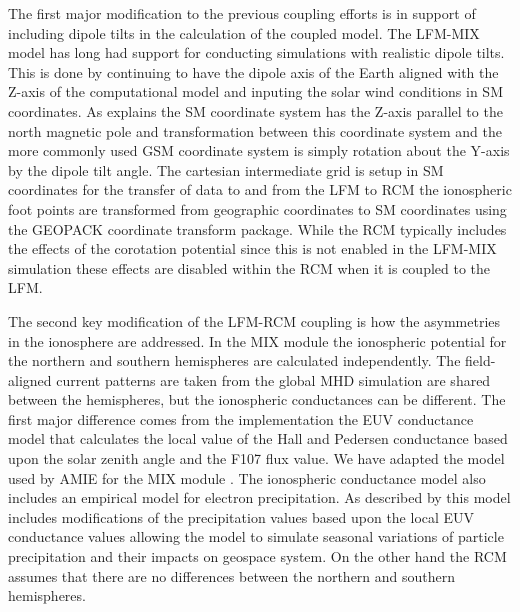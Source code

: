 \documentclass[draft,jgrga]{agutex}
\begin{document}
\begin{article}
The first major modification to the previous coupling efforts is in support of including dipole tilts in the calculation of the coupled model.  The LFM-MIX model has long had support for conducting simulations with realistic dipole tilts.  This is done by continuing to have the dipole axis of the Earth aligned with the Z-axis of the computational model and inputing the solar wind conditions in SM coordinates.  As \cite{1992P&SS...40..711H} explains the SM coordinate system has the Z-axis parallel to the north magnetic pole and transformation between this coordinate system and the more commonly used GSM coordinate system is simply rotation about the Y-axis by the dipole tilt angle.   The cartesian intermediate grid is setup in SM coordinates for the transfer of data to and from the LFM to RCM the ionospheric foot points are transformed from geographic coordinates to SM coordinates using the GEOPACK coordinate transform package.    While the RCM typically includes the effects of the corotation potential since this is not enabled in the LFM-MIX simulation these effects are disabled within the RCM when it is coupled to the LFM.  

The second key modification of the LFM-RCM coupling is how the asymmetries in the ionosphere are addressed.  In the MIX module the ionospheric potential for the northern and southern hemispheres are calculated independently.  The field-aligned current patterns are taken from the global MHD simulation are shared between the hemispheres, but the ionospheric conductances can be different.  The first major difference comes from the implementation the EUV conductance model that calculates the local value of the Hall and Pedersen conductance based upon the solar zenith angle and the F107 flux value.  We have adapted the model used by AMIE for the MIX module \cite{1992AdSpR..12...59R}.  The ionospheric conductance model also includes an empirical model for electron precipitation.  As described by \cite{2009JGRA..11401204W} this model includes modifications of the precipitation values based upon the local EUV conductance values allowing the model to simulate seasonal variations of particle precipitation and their impacts on geospace system.  On the other hand the RCM assumes that there are no differences between the northern and southern hemispheres.  


\end{article}
\end{document}

